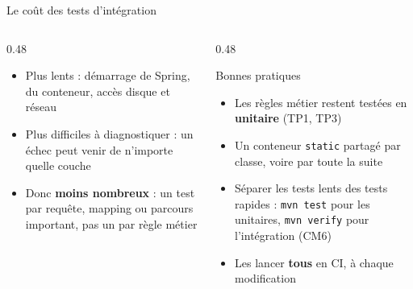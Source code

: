 \documentclass[aspectratio=169,10pt]{beamer}
\begin{document}
\begin{frame}{Le coût des tests d'intégration}
  \begin{columns}[T]
    \begin{column}{0.48\textwidth}
      \begin{itemize}
        \item Plus lents : démarrage de Spring, du conteneur, accès disque et réseau
        \item Plus difficiles à diagnostiquer : un échec peut venir de n'importe quelle couche
        \item Donc \textbf{moins nombreux} : un test par requête, mapping ou parcours important, pas un par règle métier
      \end{itemize}
    \end{column}
    \begin{column}{0.48\textwidth}
      \begin{block}{Bonnes pratiques}
        \begin{itemize}
          \item Les règles métier restent testées en \textbf{unitaire} (TP1, TP3)
          \item Un conteneur \texttt{static} partagé par classe, voire par toute la suite
          \item Séparer les tests lents des tests rapides : \texttt{mvn test} pour les unitaires, \texttt{mvn verify} pour l'intégration (CM6)
          \item Les lancer \textbf{tous} en CI, à chaque modification
        \end{itemize}
      \end{block}
    \end{column}
  \end{columns}
\end{frame}
\end{document}
